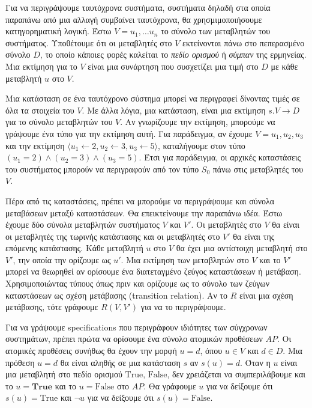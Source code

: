 \documentclass{article}
\newcommand{\english}[1]{\foreignlanguage{english}{{#1}}}
\begin{document}
Για να περιγράψουμε ταυτόχρονα συστήματα, συστήματα δηλαδή στα οποία παραπάνω από μια αλλαγή συμβαίνει ταυτόχρονα, θα χρησμιμοποιήσουμε κατηγορηματική λογική. Έστω $V = {u_1, \ldots u_n}$ το σύνολο των μεταβλητών του συστήματος. Υποθέτουμε ότι οι μεταβλητές στο $V$ εκτείνονται πάνω στο πεπερασμένο σύνολο $D$, το οποίο κάποιες φορές καλείται το \textit{πεδίο ορισμού} ή \textit{σύμπαν} της ερμηνείας. Μια εκτίμηση για το $V$ είναι μια συνάρτηση που συσχετίζει μια τιμή στο $D$ με κάθε μεταβλητή $u$ στο $V$.

Μια κατάσταση σε ένα ταυτόχρονο σύστημα μπορεί να περιγραφεί δίνοντας τιμές σε όλα τα στοιχεία του $V$. Με άλλα λόγια, μια κατάσταση, είναι μια εκτίμηση $s. V \rightarrow D$ για το σύνολο μεταβλητών του $V$. Αν γνωρίζουμε την εκτίμηση, μπορούμε να γράψουμε ένα τύπο για την εκτίμηση αυτή. Για παράδειγμα, αν έχουμε $V = {u_1, u_2, u_3}$ και την εκτίμηση $\langle u_1 \leftarrow 2, u_2 \leftarrow 3, u_3 \leftarrow 5 \rangle$, καταλήγουμε στον τύπο $(u_1=2) \wedge (u_2 = 3) \wedge (u_3 = 5)$. Έτσι για παράδειγμα, οι αρχικές καταστάσεις του συστήματος μπορούν να περιγραφούν από τον τύπο $S_0$ πάνω στις μεταβλητές του $V$.

Πέρα από τις καταστάσεις, πρέπει να μπορούμε να περιγράψουμε και σύνολα μεταβάσεων μεταξύ καταστάσεων. Θα επεικτείνουμε την παραπάνω ιδέα. Έστω έχουμε δύο σύνολα μεταβλητών συστήματος $V$ και $V'$. Οι μεταβλητές στο $V$ θα είναι οι μεταβλητές της τωρινής κατάστασης και οι μεταβλητές στο $V'$ θα είναι της επόμενης κατάστασης. Κάθε μεταβλητή $u$ στο $V$ θα έχει μια αντίστοιχη μεταβλητή στο $V'$, την οποία την ορίζουμε ως $u'$. Μια εκτίμηση των μεταβλητών στο $V$ και το $V'$ μπορεί να θεωρηθεί αν ορίσουμε ένα διατεταγμένο ζεύγος καταστάσεων ή μετάβαση. Χρησιμοποιώντας τύπους όπως πριν και ορίζουμε ως το σύνολο των ζεύγων καταστάσεων ως σχέση μετάβασης (\english{transition relation}). Αν το $R$ είναι μια σχέση μετάβασης, τότε γράφουμε $R(V, V')$ για να το περιγράψουμε. 

Για να γράψουμε \english{specifications} που περιγράφουν ιδιότητες των σύγχρονων συστημάτων, πρέπει πρώτα να ορίσουμε ένα σύνολο ατομικών προθέσεων $AP$. Οι ατομικές προθέσεις συνήθως θα έχουν την μορφή $u=d$, όπου $u \in V$ και $d \in D$. Μια πρόθεση $u=d$ θα είναι αληθής σε μια κατάσταση $s$ αν $s(u) = d$. Όταν η $u$ είναι μια μεταβλητή στο πεδίο ορισμού \english{${\text{True, False}}$}, δεν χρειάζεται να συμπεριλάβουμε και το \english{$u = \textbf{True}$} και το \english{$u = \text{False}$} στο $AP$. Θα γράφουμε $u$ για να δείξουμε ότι $s(u) = \text{True}$ και $\neg u$ για να δείξουμε ότι \english{$s(u) = \text{False}$}.
\end{document}
